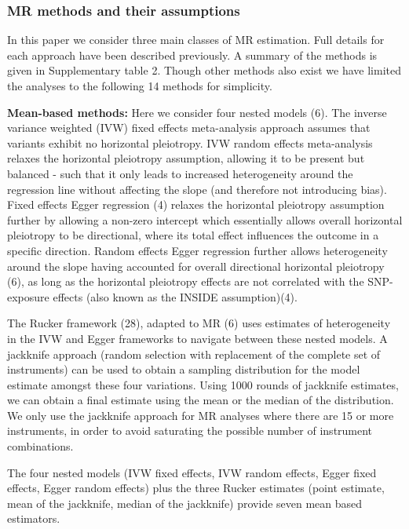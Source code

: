 \documentclass[]{article}
\begin{document}
\subsubsection{MR methods and their
assumptions}\label{mr-methods-and-their-assumptions}

In this paper we consider three main classes of MR estimation. Full
details for each approach have been described previously. A summary of
the methods is given in Supplementary table 2. Though other methods also
exist we have limited the analyses to the following 14 methods for
simplicity.

\textbf{Mean-based methods:} Here we consider four nested models (6).
The inverse variance weighted (IVW) fixed effects meta-analysis approach
assumes that variants exhibit no horizontal pleiotropy. IVW random
effects meta-analysis relaxes the horizontal pleiotropy assumption,
allowing it to be present but balanced - such that it only leads to
increased heterogeneity around the regression line without affecting the
slope (and therefore not introducing bias). Fixed effects Egger
regression (4) relaxes the horizontal pleiotropy assumption further by
allowing a non-zero intercept which essentially allows overall
horizontal pleiotropy to be directional, where its total effect
influences the outcome in a specific direction. Random effects Egger
regression further allows heterogeneity around the slope having
accounted for overall directional horizontal pleiotropy (6), as long as
the horizontal pleiotropy effects are not correlated with the
SNP-exposure effects (also known as the INSIDE assumption)(4).

The Rucker framework (28), adapted to MR (6) uses estimates of
heterogeneity in the IVW and Egger frameworks to navigate between these
nested models. A jackknife approach (random selection with replacement
of the complete set of instruments) can be used to obtain a sampling
distribution for the model estimate amongst these four variations. Using
1000 rounds of jackknife estimates, we can obtain a final estimate using
the mean or the median of the distribution. We only use the jackknife
approach for MR analyses where there are 15 or more instruments, in
order to avoid saturating the possible number of instrument
combinations.

The four nested models (IVW fixed effects, IVW random effects, Egger
fixed effects, Egger random effects) plus the three Rucker estimates
(point estimate, mean of the jackknife, median of the jackknife) provide
seven mean based estimators.
\end{document}
